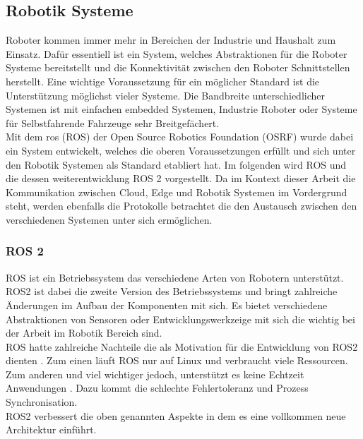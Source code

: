 \subsection{Robotik Systeme} %
\label{sub:Robotik Systeme}

Roboter kommen immer mehr in Bereichen der Industrie und Haushalt zum Einsatz. Dafür essentiell ist ein System, welches Abstraktionen für die Roboter Systeme bereitstellt und die Konnektivität zwischen den Roboter Schnittstellen herstellt. Eine wichtige Voraussetzung für ein möglicher Standard ist die Unterstützung möglichst vieler Systeme. Die Bandbreite unterschiedlicher Systemen ist mit einfachen embedded Systemen, Industrie Roboter oder Systeme für Selbstfahrende Fahrzeuge sehr Breitgefächert.\\
Mit dem \acrlong{ros} (ROS) der Open Source Robotics Foundation (OSRF) wurde dabei ein System entwickelt, welches die oberen Voraussetzungen erfüllt und sich unter den Robotik Systemen als Standard etabliert hat. Im folgenden wird ROS und die dessen weiterentwicklung ROS 2 vorgestellt. Da im Kontext dieser Arbeit die Kommunikation zwischen Cloud, Edge und Robotik Systemen im Vordergrund steht, werden ebenfalls die Protokolle betrachtet die den Austausch zwischen den verschiedenen Systemen unter sich ermöglichen.

\subsubsection{ROS 2} %
\label{ssub:ROS 2}

ROS \cite{ConceptsROSDocumentation} ist ein Betriebssystem das verschiedene Arten von Robotern unterstützt. ROS2 ist dabei die zweite Version des Betriebssystems und bringt zahlreiche Änderungen im Aufbau der Komponenten mit sich. Es bietet verschiedene Abstraktionen von Sensoren oder Entwicklungswerkzeige mit sich die wichtig bei der Arbeit im Robotik Bereich sind.\\
ROS hatte zahlreiche Nachteile die als Motivation für die Entwicklung von ROS2 dienten \cite{maruyamaExploringPerformanceROS22016}. Zum einen läuft ROS nur auf Linux und verbraucht viele Ressourcen. Zum anderen und viel wichtiger jedoch, unterstützt es keine Echtzeit Anwendungen \cite{ConceptsROSDocumentation}. Dazu kommt die schlechte Fehlertoleranz und Prozess Synchronisation.\\
ROS2 verbessert die oben genannten Aspekte in dem es eine vollkommen neue Architektur einführt.

